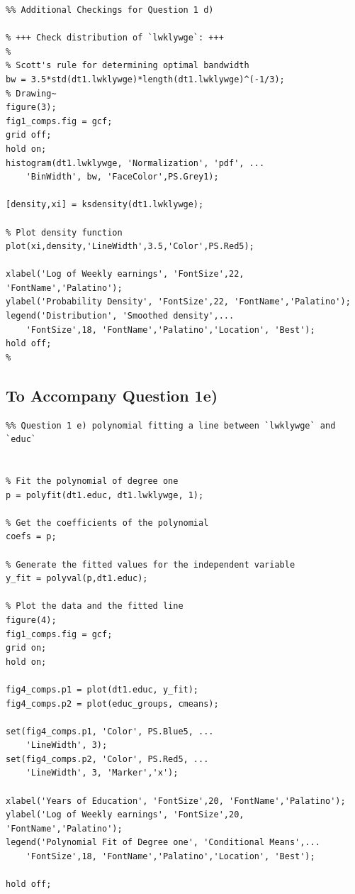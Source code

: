 \documentclass[9pt]{tufte-handout}
\begin{document}
\begin{lstlisting}
%% Additional Checkings for Question 1 d)

% +++ Check distribution of `lwklywge`: +++
% 
% Scott's rule for determining optimal bandwidth
bw = 3.5*std(dt1.lwklywge)*length(dt1.lwklywge)^(-1/3);
% Drawing~
figure(3);
fig1_comps.fig = gcf;
grid off;
hold on;
histogram(dt1.lwklywge, 'Normalization', 'pdf', ...
    'BinWidth', bw, 'FaceColor',PS.Grey1);

[density,xi] = ksdensity(dt1.lwklywge);

% Plot density function
plot(xi,density,'LineWidth',3.5,'Color',PS.Red5);

xlabel('Log of Weekly earnings', 'FontSize',22, 'FontName','Palatino');
ylabel('Probability Density', 'FontSize',22, 'FontName','Palatino');
legend('Distribution', 'Smoothed density',...
    'FontSize',18, 'FontName','Palatino','Location', 'Best');
hold off;
%
\end{lstlisting}

\newpage

\subsection{To Accompany Question 1e)}
\begin{lstlisting}
%% Question 1 e) polynomial fitting a line between `lwklywge` and `educ`


% Fit the polynomial of degree one
p = polyfit(dt1.educ, dt1.lwklywge, 1);

% Get the coefficients of the polynomial
coefs = p;

% Generate the fitted values for the independent variable
y_fit = polyval(p,dt1.educ);

% Plot the data and the fitted line
figure(4);
fig1_comps.fig = gcf;
grid on;
hold on;

fig4_comps.p1 = plot(dt1.educ, y_fit);
fig4_comps.p2 = plot(educ_groups, cmeans);

set(fig4_comps.p1, 'Color', PS.Blue5, ...
    'LineWidth', 3);
set(fig4_comps.p2, 'Color', PS.Red5, ...
    'LineWidth', 3, 'Marker','x');

xlabel('Years of Education', 'FontSize',20, 'FontName','Palatino'); 
ylabel('Log of Weekly earnings', 'FontSize',20, 'FontName','Palatino');
legend('Polynomial Fit of Degree one', 'Conditional Means',...
    'FontSize',18, 'FontName','Palatino','Location', 'Best');

hold off;
\end{lstlisting}





\newpage

\end{document}
